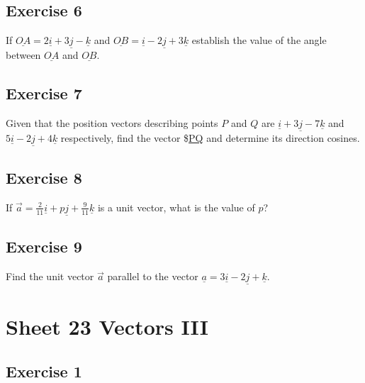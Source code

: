 \documentclass[
  11pt,
  oneside]{book}
\newcommand{\slide}{}
\theoremstyle{definition}
\theoremstyle{definition}
\theoremstyle{definition}
\theoremstyle{definition}
\theoremstyle{remark}
\begin{document}
\slide

\subsection*{Exercise 6}\label{exercise-6-5}

If \(\underline{OA}=2\underline{i}+3\underline{j}-\underline{k}\) and \(\underline{OB}=\underline{i}-2\underline{j}+3\underline{k}\) establish the value of the angle between \(\underline{OA}\) and \(\underline{OB}\).

\slide

\subsection*{Exercise 7}\label{exercise-7-2}

Given that the position vectors describing points \(P\) and \(Q\) are \(\underline{i}+3\underline{j}-7\underline{k}\) and \(5\underline{i}-2\underline{j}+4\underline{k}\) respectively, find the vector \$\underline{PQ} and determine its direction cosines.

\slide

\subsection*{Exercise 8}\label{exercise-8-1}

If \(\vec{a}=\frac2{11}\underline{i}+p\underline{j}+\frac9{11}\underline{k}\) is a unit vector, what is the value of \(p\)?

\slide

\subsection*{Exercise 9}\label{exercise-9-1}

Find the unit vector \(\vec{a}\) parallel to the vector \(\underline a=3\underline{i}-2\underline{j}+\underline{k}\).

\slide

\section{Sheet 23 Vectors III}\label{sheet-23-vectors-iii}

\subsection*{Exercise 1}\label{exercise-1-14}
\end{document}
